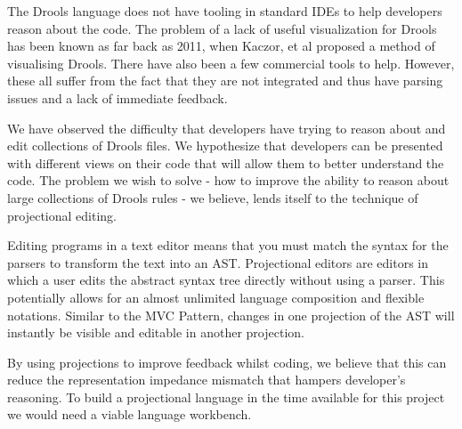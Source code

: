 The Drools language does not have tooling in standard IDEs to help developers reason about the code.
The problem of a lack of useful visualization for Drools has been known as far back as 2011, when Kaczor, et al\cite{kaczor2011visual} proposed a method of visualising Drools. 
There have also been a few commercial tools to help.
However, these all suffer from the fact that they are not integrated and thus have parsing issues and a lack of immediate feedback. 

We have observed the difficulty that developers have trying to reason about and edit collections of Drools files.
We hypothesize that developers can be presented with different views on their code that will allow them to better understand the code.
The problem we wish to solve - how to improve the ability to reason about large collections of Drools rules - we believe, lends itself to the technique of projectional editing.

Editing programs in a text editor means that you must match the syntax for the parsers to transform the text into an AST.
Projectional editors are editors in which a user edits the abstract syntax tree directly without using a parser\cite{voelter2014generic}.
This potentially allows for an almost unlimited language composition and flexible notations.
Similar to the MVC Pattern, changes in one projection of the AST will instantly be visible and editable in another projection\cite{guttormsen2017consistent}.

By using projections to improve feedback whilst coding, we believe that this can reduce the representation impedance mismatch that hampers developer's reasoning.
To build a projectional language in the time available for this project we would need a viable language workbench.
